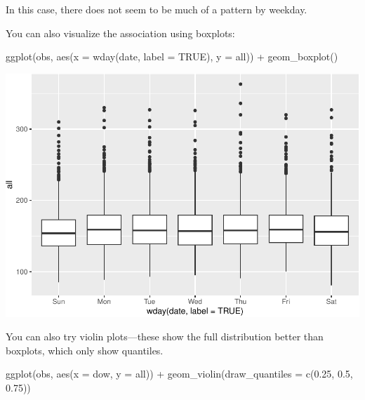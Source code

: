 \documentclass[
]{book}
\newenvironment{Shaded}{\begin{snugshade}}{\end{snugshade}}
\newcommand{\AttributeTok}[1]{\textcolor[rgb]{0.77,0.63,0.00}{#1}}
\newcommand{\ConstantTok}[1]{\textcolor[rgb]{0.00,0.00,0.00}{#1}}
\newcommand{\FloatTok}[1]{\textcolor[rgb]{0.00,0.00,0.81}{#1}}
\newcommand{\FunctionTok}[1]{\textcolor[rgb]{0.00,0.00,0.00}{#1}}
\newcommand{\NormalTok}[1]{#1}
\newcommand{\SpecialCharTok}[1]{\textcolor[rgb]{0.00,0.00,0.00}{#1}}
\begin{document}
In this case, there does not seem to be much of a pattern by weekday.

You can also visualize the association using boxplots:

\begin{Shaded}
\begin{Highlighting}[]
\FunctionTok{ggplot}\NormalTok{(obs, }\FunctionTok{aes}\NormalTok{(}\AttributeTok{x =} \FunctionTok{wday}\NormalTok{(date, }\AttributeTok{label =} \ConstantTok{TRUE}\NormalTok{), }\AttributeTok{y =}\NormalTok{ all)) }\SpecialCharTok{+} 
  \FunctionTok{geom\_boxplot}\NormalTok{()}
\end{Highlighting}
\end{Shaded}

\includegraphics{adv_epi_analysis_files/figure-latex/unnamed-chunk-21-1.pdf}

You can also try violin plots---these show the full distribution better than
boxplots, which only show quantiles.

\begin{Shaded}
\begin{Highlighting}[]
\FunctionTok{ggplot}\NormalTok{(obs, }\FunctionTok{aes}\NormalTok{(}\AttributeTok{x =}\NormalTok{ dow, }\AttributeTok{y =}\NormalTok{ all)) }\SpecialCharTok{+} 
  \FunctionTok{geom\_violin}\NormalTok{(}\AttributeTok{draw\_quantiles =} \FunctionTok{c}\NormalTok{(}\FloatTok{0.25}\NormalTok{, }\FloatTok{0.5}\NormalTok{, }\FloatTok{0.75}\NormalTok{))}
\end{Highlighting}
\end{Shaded}
\end{document}
